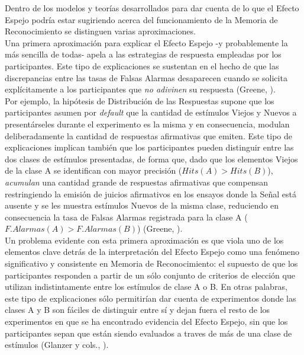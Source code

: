 Dentro de los modelos y teorías desarrollados para dar cuenta de lo que el Efecto Espejo podría estar sugiriendo acerca del funcionamiento de la Memoria de Reconocimiento se distinguen varias aproximaciones.\\

Una primera aproximación para explicar el Efecto Espejo -y probablemente la más sencilla de todas- apela a las estrategias de respuesta empleadas por los participantes. Este tipo de explicaciones se sustentan en el hecho de que las discrepancias entre las tasas de Falsas Alarmas desaparecen cuando se solicita explícitamente a los participantes que \textit{no adivinen} su respuesta (Greene, \citeyear{Greene1996}).\\

Por ejemplo, la hipótesis de Distribución de las Respuestas supone que los participantes asumen por \textit{default} que la cantidad de estímulos Viejos y Nuevos a presentárseles durante el experimento es la misma y en consecuencia, modulan deliberadamente la cantidad de respuestas afirmativas que emiten. Este tipo de explicaciones implican también que los participantes pueden distinguir entre las dos clases de estímulos presentadas, de forma que, dado que los elementos Viejos de la clase A se identifican con mayor precisión ($Hits(A) > Hits(B)$), \textit{acumulan} una cantidad grande de respuestas afirmativas que compensan restringiendo la emisión de juicios afirmativos en los ensayos donde la Señal está ausente y se les muestra estímulos Nuevos de la misma clase, reduciendo en consecuencia la tasa de Falsas Alarmas registrada para la clase A ($F.Alarmas(A) > F.Alarmas(B)$) (Greene, \citeyear{Greene1996}).\\

Un problema evidente con esta primera aproximación es que viola uno de los elementos clave detrás de la interpretación del Efecto Espejo como una fenómeno significativo y consistente en Memoria de Reconocimiento: el supuesto de que los participantes responden a partir de un sólo conjunto de criterios de elección que utilizan indistintamente entre los estímulos de clase A o B. En otras palabras, este tipo de explicaciones sólo permitirían dar cuenta de experimentos donde las clases A y B son fáciles de distinguir entre sí y dejan fuera el resto de los experimentos en que se ha encontrado evidencia del Efecto Espejo, sin que los participantes sepan que están siendo evaluados a traves de más de una clase de estímulos (Glanzer y cols., \citeyear{Glanzer1998}).\\


